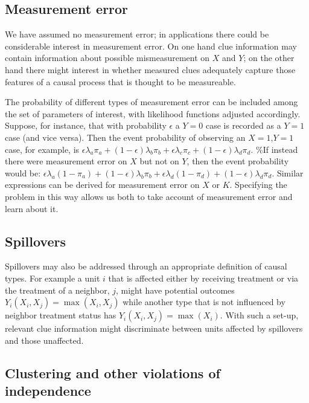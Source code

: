 \documentclass[
  12pt,
]{book}
\begin{document}
\hypertarget{measurement-error}{%
\subsection{Measurement error}\label{measurement-error}}

We have assumed no measurement error; in applications there could be considerable interest in measurement error. On one hand clue information may contain information about possible mismeasurement on \(X\) and \(Y\); on the other hand there might interest in whether measured clues adequately capture those features of a causal process that is thought to be measureable.

The probability of different types of measurement error can be included among the set of parameters of interest, with likelihood functions adjusted accordingly. Suppose, for instance, that with probability \(\epsilon\) a \(Y=0\) case is recorded as a \(Y=1\) case (and vice versa). Then the event probability of observing an \(X=1\),\(Y=1\) case, for example, is \(\epsilon \lambda_a \pi_a + (1-\epsilon) \lambda_b \pi_b + \epsilon \lambda_c \pi_c + (1-\epsilon) \lambda_d \pi_d\). \%If instead there were measurement error on \(X\) but not on \(Y\), then the event probability would be: \(\epsilon \lambda_a (1-\pi_a) + (1-\epsilon) \lambda_b \pi_b + \epsilon \lambda_d (1-\pi_d) + (1-\epsilon) \lambda_d \pi_d\).
Similar expressions can be derived for measurement error on \(X\) or \(K\). Specifying the problem in this way allows us both to take account of measurement error and learn about it.

\hypertarget{spillovers}{%
\subsection{Spillovers}\label{spillovers}}

Spillovers may also be addressed through an appropriate definition of causal types. For example a unit \(i\) that is affected either by receiving treatment or via the treatment of a neighbor, \(j\), might have potential outcomes \(Y_i(X_i,X_j)=\max(X_i,X_j)\) while another type that is not influenced by neighbor treatment status has \(Y_i(X_i,X_j)=\max(X_i)\). With such a set-up, relevant clue information might discriminate between units affected by spillovers and those unaffected.

\hypertarget{clustering-and-other-violations-of-independence}{%
\subsection{Clustering and other violations of independence}\label{clustering-and-other-violations-of-independence}}
\end{document}
